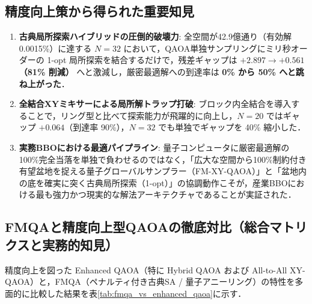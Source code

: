 \documentclass[11pt,a4paper]{ltjsarticle}
\begin{document}
\vspace{-2mm}
\subsection{精度向上策から得られた重要知見}
\begin{enumerate}\setlength{\itemsep}{1.5pt}
    \item \textbf{古典局所探索ハイブリッドの圧倒的破壊力}: 全空間が42.9億通り（有効解 0.0015\%）に達する $N=32$ において，QAOA単独サンプリングにミリ秒オーダーの 1-opt 局所探索を結合するだけで，残差ギャップは \textbf{$+2.897 \to +0.561$（81\% 削減）} へと激減し，厳密最適解への到達率は \textbf{0\% から 50\% へと跳ね上がった}．
    \item \textbf{全結合XYミキサーによる局所解トラップ打破}: ブロック内全結合を導入することで，リング型と比べて探索能力が飛躍的に向上し，$N=20$ ではギャップ $+0.064$（到達率 90\%），$N=32$ でも単独でギャップを 40\% 縮小した．
    \item \textbf{実務BBOにおける最適パイプライン}: 量子コンピュータに厳密最適解の100\%完全当落を単独で負わせるのではなく，「広大な空間から100\%制約付き有望盆地を捉える量子グローバルサンプラー（FM-XY-QAOA）」と「盆地内の底を確実に突く古典局所探索（1-opt）」の協調動作こそが，産業BBOにおける最も強力かつ現実的な解法アーキテクチャであることが実証された．
\end{enumerate}

\subsection{FMQAと精度向上型QAOAの徹底対比（総合マトリクスと実務的知見）}
精度向上を図った Enhanced QAOA（特に Hybrid QAOA および All-to-All XY-QAOA）と，FMQA（ペナルティ付き古典SA / 量子アニーリング）の特性を多面的に比較した結果を表\ref{tab:fmqa_vs_enhanced_qaoa}に示す．
\end{document}
